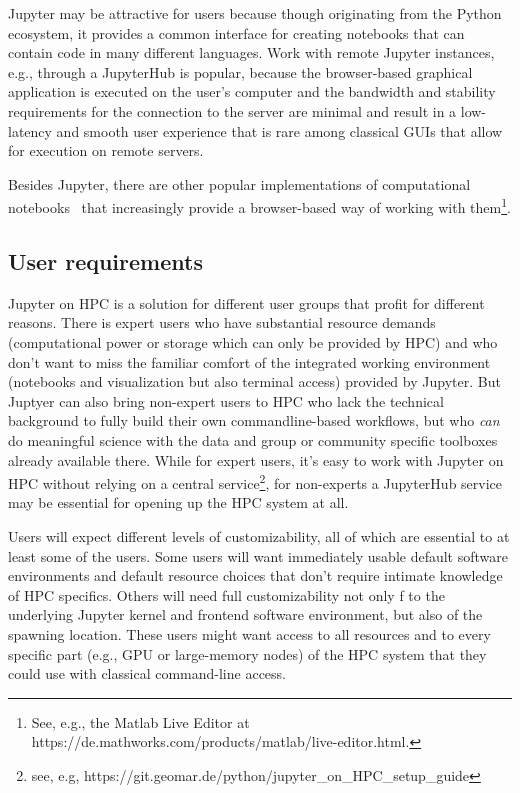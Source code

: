 Jupyter may be attractive for users because though originating from the Python ecosystem, it provides a common interface for creating notebooks that can contain code in many different languages.
Work with remote Jupyter instances, e.g., through a JupyterHub is popular, because the browser-based graphical application is executed on the user's computer and the bandwidth and stability requirements for the connection to the server are minimal and result in a low-latency and smooth user experience that is rare among classical GUIs that allow for execution on remote servers.

Besides Jupyter, there are other popular implementations of computational notebooks~\citep{Hinsen2019a} that increasingly provide a browser-based way of working with them\footnote{See, e.g., the Matlab Live Editor at https://de.mathworks.com/products/matlab/live-editor.html.}.


\subsection{User requirements}

Jupyter on HPC is a solution for different user groups that profit for different reasons.
There is expert users who have substantial resource demands (computational power or storage which can only be provided by HPC) and who don't want to miss the familiar comfort of the integrated working environment (notebooks and visualization but also terminal access) provided by Jupyter.
But Juptyer can also bring non-expert users to HPC who lack the technical background to fully build their own commandline-based workflows, but who \emph{can} do meaningful science with the data and group or community specific toolboxes already available there.
While for expert users, it's easy to work with Jupyter on HPC without relying on a central service\footnote{see, e.g, https://git.geomar.de/python/jupyter_on_HPC_setup_guide}, for non-experts a JupyterHub service may be essential for opening up the HPC system at all.

Users will expect different levels of customizability, all of which are essential to at least some of the users.
Some users will want immediately usable default software environments and default resource choices that don't require intimate knowledge of HPC specifics.
Others will need full customizability not only f to the underlying Jupyter kernel and frontend software environment, but also of the spawning location.
These users might want access to all resources and to every specific part (e.g., GPU or large-memory nodes) of the HPC system that they could use with classical command-line access.

